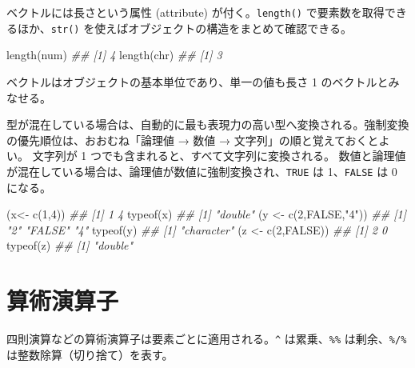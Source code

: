 \documentclass[
  letterpaper,
  xelatex,
  ja=standard, xelatex]{bxjsbook}
\newenvironment{Shaded}{\begin{snugshade}}{\end{snugshade}}
\newcommand{\ConstantTok}[1]{\textcolor[rgb]{0.56,0.35,0.01}{#1}}
\newcommand{\DecValTok}[1]{\textcolor[rgb]{0.68,0.00,0.00}{#1}}
\newcommand{\DocumentationTok}[1]{\textcolor[rgb]{0.37,0.37,0.37}{\textit{#1}}}
\newcommand{\FunctionTok}[1]{\textcolor[rgb]{0.28,0.35,0.67}{#1}}
\newcommand{\NormalTok}[1]{\textcolor[rgb]{0.00,0.23,0.31}{#1}}
\newcommand{\OtherTok}[1]{\textcolor[rgb]{0.00,0.23,0.31}{#1}}
\newcommand{\StringTok}[1]{\textcolor[rgb]{0.13,0.47,0.30}{#1}}
\begin{document}
ベクトルには長さという属性 (attribute) が付く。\texttt{length()}
で要素数を取得できるほか、\texttt{str()}
を使えばオブジェクトの構造をまとめて確認できる。

\begin{Shaded}
\begin{Highlighting}[]
\FunctionTok{length}\NormalTok{(num)}
\DocumentationTok{\#\# [1] 4}
\FunctionTok{length}\NormalTok{(chr)}
\DocumentationTok{\#\# [1] 3}
\end{Highlighting}
\end{Shaded}

ベクトルはオブジェクトの基本単位であり、単一の値も長さ 1
のベクトルとみなせる。

型が混在している場合は、自動的に最も表現力の高い型へ変換される。強制変換の優先順位は、おおむね「論理値
→ 数値 → 文字列」の順と覚えておくとよい。 文字列が 1
つでも含まれると、すべて文字列に変換される。
数値と論理値が混在している場合は、論理値が数値に強制変換され、\texttt{TRUE}
は 1、\texttt{FALSE} は 0 になる。

\begin{Shaded}
\begin{Highlighting}[]
\NormalTok{(x}\OtherTok{\textless{}{-}} \FunctionTok{c}\NormalTok{(}\DecValTok{1}\NormalTok{,}\DecValTok{4}\NormalTok{))}
\DocumentationTok{\#\# [1] 1 4}
\FunctionTok{typeof}\NormalTok{(x)}
\DocumentationTok{\#\# [1] "double"}
\NormalTok{(y }\OtherTok{\textless{}{-}} \FunctionTok{c}\NormalTok{(}\DecValTok{2}\NormalTok{,}\ConstantTok{FALSE}\NormalTok{,}\StringTok{"4"}\NormalTok{))}
\DocumentationTok{\#\# [1] "2"     "FALSE" "4"}
\FunctionTok{typeof}\NormalTok{(y)}
\DocumentationTok{\#\# [1] "character"}
\NormalTok{(z }\OtherTok{\textless{}{-}} \FunctionTok{c}\NormalTok{(}\DecValTok{2}\NormalTok{,}\ConstantTok{FALSE}\NormalTok{))}
\DocumentationTok{\#\# [1] 2 0}
\FunctionTok{typeof}\NormalTok{(z)}
\DocumentationTok{\#\# [1] "double"}
\end{Highlighting}
\end{Shaded}

\section{算術演算子}\label{ux7b97ux8853ux6f14ux7b97ux5b50}

四則演算などの算術演算子は要素ごとに適用される。\texttt{\^{}}
は累乗、\texttt{\%\%} は剰余、\texttt{\%/\%}
は整数除算（切り捨て）を表す。
\end{document}

